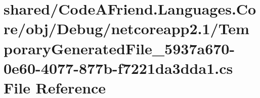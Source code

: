 \hypertarget{shared_2_code_a_friend_8_languages_8_core_2obj_2_debug_2netcoreapp2_81_2_temporary_generated_fil5a9ab9a0c8fe6ba3bee816d5668ccf5b}{}\section{shared/\+Code\+A\+Friend.Languages.\+Core/obj/\+Debug/netcoreapp2.1/\+Temporary\+Generated\+File\+\_\+5937a670-\/0e60-\/4077-\/877b-\/f7221da3dda1.cs File Reference}
\label{shared_2_code_a_friend_8_languages_8_core_2obj_2_debug_2netcoreapp2_81_2_temporary_generated_fil5a9ab9a0c8fe6ba3bee816d5668ccf5b}
